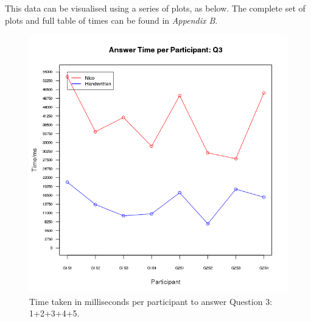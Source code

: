 \documentclass[12pt,twoside,notitlepage,xetex]{report}
\begin{document}
This data can be visualised using a series of plots, as below.  The complete set of plots and full table of times can be found in \emph{Appendix B}.

\begin{center}
\begin{figure}[H]
\begin{center}
\includegraphics[width=\textwidth-2cm]{figs/graphs/q3.png}
\end{center}
\caption{Time taken in milliseconds per participant to answer Question 3: 1+2+3+4+5.}
\label{fig:PlotQ3}
\end{figure}
\end{center}
\end{document}

